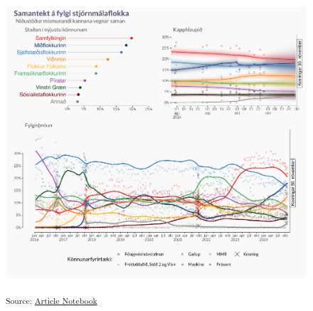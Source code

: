 \documentclass[
  letterpaper,
  DIV=11,
  numbers=noendperiod,
  oneside]{scrartcl}
\begin{document}
\begin{figure}

\includegraphics{index_files/figure-pdf/unnamed-chunk-1-1.pdf}

\textsubscript{Source:
\href{https://metill-is.github.io/kosningaspa/index.qmd.html}{Article
Notebook}}

\end{figure}%
\end{document}
